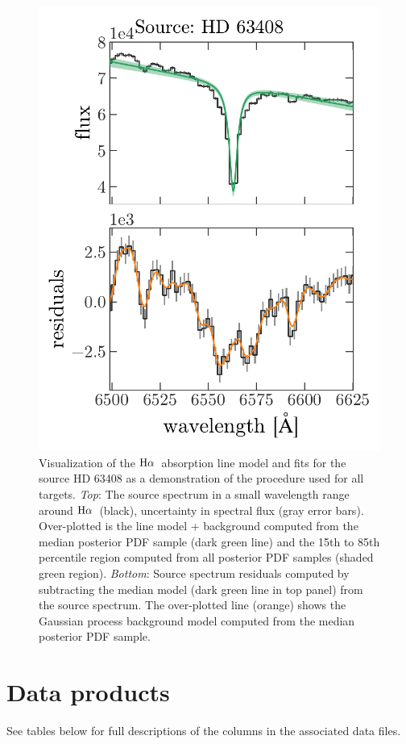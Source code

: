 \documentclass[modern, letterpaper]{aastex61}
\newcommand{\Ha}{\ensuremath{{\rm H}\alpha}}
\begin{document}
\begin{figure}[htbp]
  \begin{center}
    \includegraphics[width=0.5\linewidth]{mcmc_example_fit.pdf}
  \end{center}
  \caption{%
    Visualization of the \Ha\ absorption line model and fits for the source HD
    63408 as a demonstration of the procedure used for all targets.
    \emph{Top}:
    The source spectrum in a small wavelength range around \Ha\ (black),
    uncertainty in spectral flux (gray error bars).
    Over-plotted is the line model + background computed from the median
    posterior PDF sample (dark green line) and the 15th to 85th percentile
    region computed from all posterior PDF samples (shaded green region).
    \emph{Bottom}:
    Source spectrum residuals computed by subtracting the median model (dark
    green line in top panel) from the source spectrum.
    The over-plotted line (orange) shows the Gaussian process background model
    computed from the median posterior PDF sample.
    \label{fig:Halpha-mcmc-fit}}
\end{figure}

\section{Data products} \label{sec:table}

See tables below for full descriptions of the columns in the associated data
files.
\end{document}
